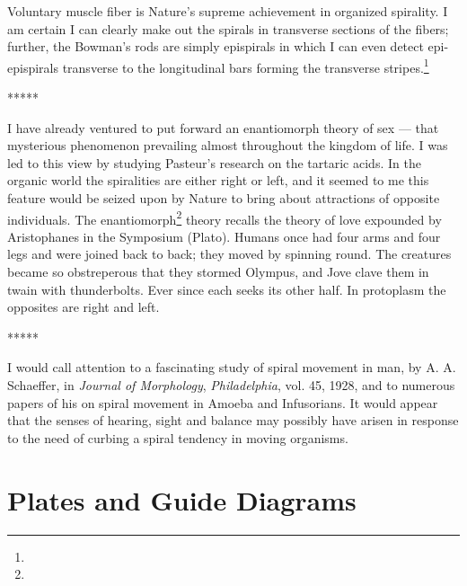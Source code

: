 \documentclass[a4paper, 12pt, oneside]{article}
\begin{document}
Voluntary muscle fiber is Nature's supreme achievement in organized spirality. I am certain I can clearly make out the spirals in transverse sections of the fibers; further, the Bowman's rods are simply epispirals in which I can even detect epi-epispirals transverse to the longitudinal bars forming the transverse stripes.\footnote{}

\centerline{*\hspace{15mm}*\hspace{15mm}*\hspace{15mm}*\hspace{15mm}*}
\bigskip

I have already ventured to put forward an enantiomorph theory of sex --- that mysterious phenomenon prevailing almost throughout the kingdom of life. I was led to this view by studying Pasteur's research on the tartaric acids. In the organic world the spiralities are either right or left, and it seemed to me this feature would be seized upon by Nature to bring about attractions of opposite individuals. The enantiomorph\footnote{} theory recalls the theory of love expounded by Aristophanes in the Symposium (Plato). Humans once had four arms and four legs and were joined back to back; they moved by spinning round. The creatures became so obstreperous that they stormed Olympus, and Jove clave them in twain with thunderbolts. Ever since each seeks its other half. In protoplasm the opposites are right and left.

\centerline{*\hspace{15mm}*\hspace{15mm}*\hspace{15mm}*\hspace{15mm}*}
\bigskip

I would call attention to a fascinating study of spiral movement in man, by A. A. Schaeffer, in \emph{Journal of Morphology}, \emph{Philadelphia}, vol. 45, 1928, and to numerous papers of his on spiral movement in Amoeba and Infusorians. It would appear that the senses of hearing, sight and balance may possibly have arisen in response to the need of curbing a spiral tendency in moving organisms.
\clearpage
\section{Plates and Guide Diagrams}
\end{document}
